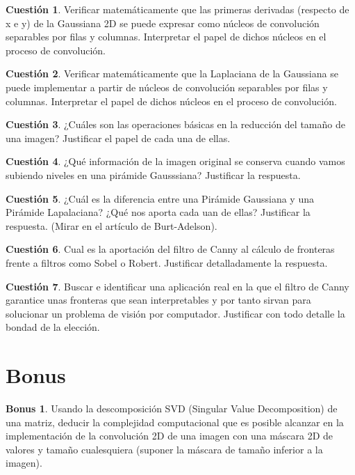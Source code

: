 \documentclass[a4paper, 11pt]{article}
\theoremstyle{definition}
\theoremstyle{theorem}
\newtheorem{cuestion}{Cuestión}
\newtheorem{bonus}{Bonus}
\begin{document}
  \begin{cuestion}
      Verificar matemáticamente que las primeras derivadas (respecto de x e y) de la Gaussiana 2D se puede expresar como núcleos de convolución separables por filas y columnas. Interpretar el papel de dichos núcleos en el proceso de convolución.
  \end{cuestion}

  \begin{cuestion}
      Verificar matemáticamente que la Laplaciana de la Gaussiana se puede implementar a partir de núcleos de convolución separables por filas y columnas. Interpretar el papel de dichos núcleos en el proceso de convolución.
  \end{cuestion}

  \begin{cuestion}
      ¿Cuáles son las operaciones básicas en la reducción del tamaño de una imagen? Justificar el papel de cada una de ellas.
  \end{cuestion}

  \begin{cuestion}
      ¿Qué información de la imagen original se conserva cuando vamos subiendo niveles en una pirámide Gausssiana? Justificar la respuesta.
  \end{cuestion}

  \begin{cuestion}
      ¿Cuál es la diferencia entre una Pirámide Gaussiana y una Pirámide Lapalaciana? ¿Qué nos aporta cada uan de ellas? Justificar la respuesta. (Mirar en el artículo de Burt-Adelson).
  \end{cuestion}

  \begin{cuestion}
      Cual es la aportación del filtro de Canny al cálculo de fronteras frente a filtros como Sobel o Robert. Justificar detalladamente la respuesta.
  \end{cuestion}

  \begin{cuestion}
      Buscar e identificar una aplicación real en la que el filtro de Canny garantice unas fronteras que sean interpretables y por tanto sirvan para solucionar un problema de visión por computador. Justificar con todo detalle la bondad de la elección.
  \end{cuestion}

  \section{Bonus}

  \begin{bonus}
      Usando la descomposición SVD (Singular Value Decomposition) de una matriz, deducir la complejidad computacional que es posible alcanzar en la implementación de la convolución 2D de una imagen con una máscara 2D de valores y tamaño cualesquiera (suponer la máscara de tamaño inferior a la imagen).
  \end{bonus}
\end{document}
